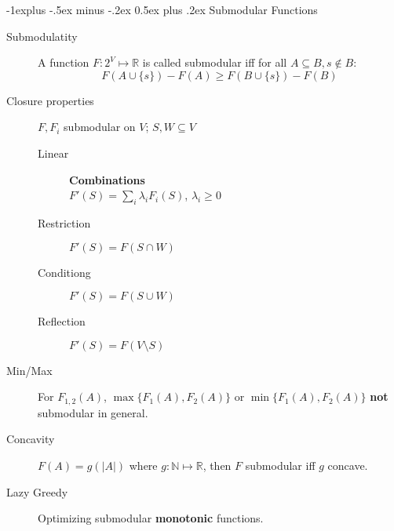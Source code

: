 \documentclass[11pt,landscape]{article}
\makeatletter
\renewcommand{\subsection}{\@startsection{subsection}{2}{0mm}%
                                {-1explus -.5ex minus -.2ex}%
                                {0.5ex plus .2ex}%
                                {\normalfont\normalsize\bfseries}}
\makeatother
\begin{document}
\begin{multicols}{3}
\subsection{Submodular Functions}
\begin{description}
    \item[Submodulatity] A function $F: 2^V \mapsto \mathbb{R}$ is called submodular iff for all $A \subseteq B, s \notin B$:
        $$F(A \cup \{s\}) - F(A) \geq F(B \cup \{s\}) - F(B)$$
    \item[Closure properties] $F, F_i$ submodular on $V$; $S, W \subseteq V$
    \begin{description}
        \item[Linear] \textbf{Combinations}\\ $F'(S) = \sum_{i} \lambda_i F_i(S)$, $\lambda_i \geq 0$
        \item[Restriction] $F'(S) = F(S \cap W)$
        \item[Conditiong] $F'(S) = F(S \cup W)$
        \item[Reflection] $F'(S) = F(V \setminus S)$
    \end{description}
    \item[Min/Max] For $F_{1,2}(A)$, $\max \{F_1(A),F_2(A) \}$ or $\min \{F_1(A),F_2(A) \}$ \textbf{not} submodular in general.
    \item[Concavity]
    $F(A) = g(|A|)$ where $g: \mathbb{N} \mapsto \mathbb{R}$, then $F$ submodular iff $g$ concave.
\item[Lazy Greedy] Optimizing submodular \textbf{monotonic} functions.
    \begin{algorithmic}[1]
            \EndIf
        \EndFor
\end{algorithmic}
\end{description}

\end{multicols}
\end{document}
